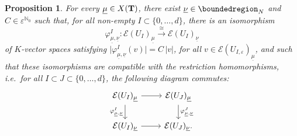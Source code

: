 \documentclass[a4paper, reqno, 10pt]{amsart}
\newtheorem{proposition}[theorem]{Proposition}
\theoremstyle{definition}
\numberwithin{equation}{section}
\newcommand{\abs}[1]{{\lvert{#1}\rvert}}
\newcommand{\lra}{\longrightarrow}
\newcommand{\ul}[1]{{\underline{#1}}}
\newcommand{\BN}{{\mathbb {N}}}
\newcommand{\CE}{{\mathcal {E}}}
\newcommand{\bT}{{\mathrm{\bf T}}}
\begin{document}
\begin{proposition}\label{Prop 2 - Existence of weight changing isomorphisms}
	For every $\ul{\mu} \in X(\bT)$, there exist $\ul{\nu} \in \boundedregion_N$ and $C\in \varepsilon^{\BN_0}$ such that, for all non-empty $I \subset \{0,\ldots,d\}$, there is an isomorphism 
	\begin{equation*}
		\varphi^I_{\ul{\mu},\ul{\nu}} \colon \CE(U_{I})_\ul{\mu} \overset{\cong}{\lra} \CE(U_{I})_\ul{\nu}
	\end{equation*}
	of $K$-vector spaces satisfying $\abs{\varphi^I_{\ul{\mu},\ul{\nu}} (v)} = C \,\abs{v}$, for all $v\in \CE(U_{I,\varepsilon})_\ul{\mu}$, and such that these isomorphisms are compatible with the restriction homomorphisms, i.e.\ for all $I \subset J \subset \{0,\ldots,d\}$, the following diagram commutes:
	\begin{equation*}
		\begin{tikzcd}
			\CE(U_{I})_\ul{\mu} \ar[r]\ar[d, "\varphi^I_{\ul{\mu},\ul{\nu}}"'] & \CE(U_{J})_\ul{\mu}	\ar[d, "\varphi^J_{\ul{\mu},\ul{\nu}}"] \\
			\CE(U_{I})_\ul{\nu} \ar[r]& \CE(U_{J})_\ul{\nu}	 .
		\end{tikzcd}
	\end{equation*}
\end{proposition}
\end{document}

